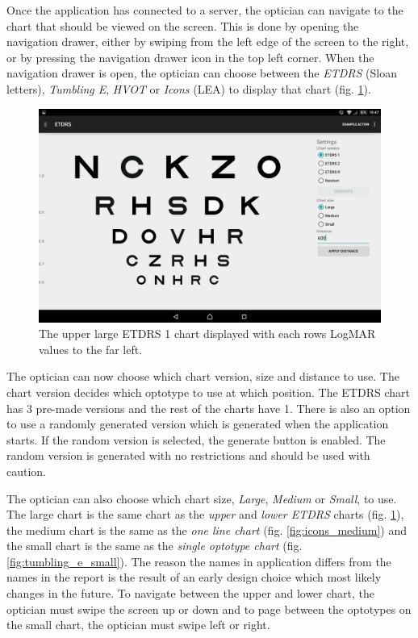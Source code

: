 \documentclass[12pt,a4paper,notitlepage]{report}
\begin{document}
Once the application has connected to a server, the optician can navigate to the chart that should be viewed on the screen. This is done by opening the navigation drawer, either by swiping from the left edge of the screen to the right, or by pressing the navigation drawer icon in the top left corner. When the navigation drawer is open, the optician can choose between the \textit{ETDRS} (Sloan letters), \textit{Tumbling E}, \textit{HVOT} or \textit{Icons} (LEA) to display that chart (fig. \ref{fig:etdrs_large}). 

\begin{figure}[ht!]
\centering
\includegraphics[width=120mm]{images/appgui/etdrs_large.png}
\caption{The upper large ETDRS 1 chart displayed with each rows LogMAR values to the far left.}
\label{fig:etdrs_large}
\end{figure}

The optician can now choose which chart version, size and distance to use. The chart version decides which optotype to use at which position. The ETDRS chart has 3 pre-made versions\cite{Ferris} and the rest of the charts have 1. There is also an option to use a randomly generated version which is generated when the application starts. If the random version is selected, the generate button is enabled. The random version is generated with no restrictions and should be used with caution.

The optician can also choose which chart size, \textit{Large}, \textit{Medium} or \textit{Small}, to use. The large chart is the same chart as the \textit{upper} and \textit{lower ETDRS} charts (fig. \ref{fig:etdrs_large}), the medium chart is the same as the \textit{one line chart} (fig. \ref{fig:icons_medium}) and the small chart is the same as the \textit{single optotype chart} (fig. \ref{fig:tumbling_e_small}). The reason the names in application differs from the names in the report is the result of an early design choice which most likely changes in the future. To navigate between the upper and lower chart, the optician must swipe the screen up or down and to page between the optotypes on the small chart, the optician must swipe left or right.
\end{document}
